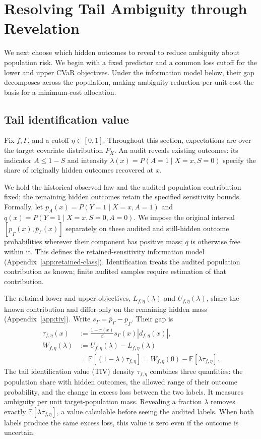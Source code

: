 \section{Resolving Tail Ambiguity through Revelation}
\label{sec:revelation}
We next choose which hidden outcomes to reveal to reduce ambiguity about population risk. We begin with a fixed predictor and a common loss cutoff for the lower and upper CVaR objectives. Under the information model below, their gap decomposes across the population, making ambiguity reduction per unit cost the basis for a minimum-cost allocation.

\subsection{Tail identification value}
\label{sec:tiv}
Fix \(f,\Gamma\), and a cutoff \(\eta\in[0,1]\). Throughout this section, expectations are over the target covariate distribution \(P_X\). An audit reveals existing outcomes: its indicator \(A\le1-S\) and intensity \(\lambda(x)=P(A=1\mid X=x,S=0)\) specify the share of originally hidden outcomes recovered at \(x\).

We hold the historical observed law and the audited population contribution fixed; the remaining
hidden outcomes retain the specified sensitivity bounds. Formally, let \(p_A(x)=P(Y=1\mid X=x,A=1)\)
and \(q(x)=P(Y=1\mid X=x,S=0,A=0)\). We impose the original interval \([\underline
p_\Gamma(x),\overline p_\Gamma(x)]\) separately on these audited and still-hidden outcome
probabilities wherever their component has positive mass; \(q\) is otherwise free within it. This
defines the retained-sensitivity information model (Appendix~\ref{app:retained-class}).
Identification treats the audited population contribution as known; finite audited samples require
estimation of that contribution.

The retained lower and upper objectives, \(L_{f,\eta}(\lambda)\) and \(U_{f,\eta}(\lambda)\), share the known contribution and differ only on the remaining hidden mass (Appendix~\ref{app:tiv}). Write \(s_\Gamma=\overline p_\Gamma-\underline p_\Gamma\). Their gap is
\begin{equation}
\begin{aligned}
\tau_{f,\eta}(x)&:=\frac{1-\pi(x)}{\beta}s_\Gamma(x)|d_{f,\eta}(x)|,\\
W_{f,\eta}(\lambda)&:=U_{f,\eta}(\lambda)-L_{f,\eta}(\lambda)\\
&=\mathbb E[(1-\lambda)\tau_{f,\eta}]
=W_{f,\eta}(0)-\mathbb E[\lambda\tau_{f,\eta}].
\end{aligned}
\label{eq:tiv-identity}
\end{equation}
The tail identification value (TIV) density \(\tau_{f,\eta}\) combines three quantities: the population share with hidden outcomes, the allowed range of their outcome probability, and the change in excess loss between the two labels. It measures ambiguity per unit target-population mass. Revealing a fraction \(\lambda\) removes exactly \(\mathbb E[\lambda\tau_{f,\eta}]\), a value calculable before seeing the audited labels. When both labels produce the same excess loss, this value is zero even if the outcome is uncertain.

